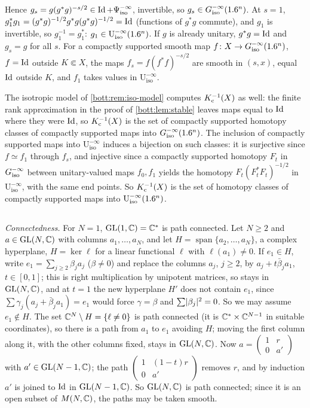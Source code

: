 Hence $g_s=g(g^*g)^{-s/2}\in\operatorname{Id}+\Psi^{-\infty}_{\mathrm{iso}}$, invertible, so $g_s\in G^{-\infty}_{\mathrm{iso}}(1.6^n)$. At $s=1$,
$g_1^*g_1=(g^*g)^{-1/2}g^*g(g^*g)^{-1/2}=\operatorname{Id}$ (functions of $g^*g$ commute), and $g_1$ is
invertible, so $g_1^{-1}=g_1^*$: $g_1\in\mathrm U^{-\infty}_{\mathrm{iso}}(1.6^n)$. If $g$ is
already unitary, $g^*g=\operatorname{Id}$ and $g_s=g$ for all $s$. For a compactly supported smooth map
$f\colon X\to G^{-\infty}_{\mathrm{iso}}(1.6^n)$, $f=\operatorname{Id}$ outside $K\Subset X$, the maps $f_s=f(f^*f)^{-s/2}$ are smooth
in $(s,x)$, equal $\operatorname{Id}$ outside $K$, and $f_1$ takes values in $\mathrm U^{-\infty}_{\mathrm{iso}}$.

The isotropic model of \cref{bott:rem:iso-model} computes $K_{\mathrm{c}}^{-1}(X)$ as well: the finite rank
approximation in the proof of \cref{bott:lem:stable} leaves maps equal to $\operatorname{Id}$ where they were
$\operatorname{Id}$, so $K_{\mathrm{c}}^{-1}(X)$ is the set of compactly supported homotopy classes of compactly supported
maps into $G^{-\infty}_{\mathrm{iso}}(1.6^n)$. The inclusion of compactly supported maps into
$\mathrm U^{-\infty}_{\mathrm{iso}}$ induces a bijection on such classes: it is surjective since
$f\simeq f_1$ through $f_s$, and injective since a compactly supported homotopy $F_t$ in $G^{-\infty}_{\mathrm{iso}}$
between unitary-valued maps $f_0,f_1$ yields the homotopy $F_t(F_t^*F_t)^{-1/2}$ in
$\mathrm U^{-\infty}_{\mathrm{iso}}$, with the same end points. So $K_{\mathrm{c}}^{-1}(X)$ is the set of
homotopy classes of compactly supported maps into $\mathrm U^{-\infty}_{\mathrm{iso}}(1.6^n)$.

\subsection*{}
\emph{Connectedness.} For $N=1$, $\operatorname{GL}(1,\mathbb{C})=\mathbb{C}^*$ is path connected. Let $N\ge2$ and
$a\in\operatorname{GL}(N,\mathbb{C})$ with columns $a_1,\dots,a_N$, and let $H=\operatorname{span}\{a_2,\dots,a_N\}$,
a complex hyperplane, $H=\ker\ell$ for a linear functional $\ell$ with $\ell(a_1)\ne0$. If
$e_1\in H$, write $e_1=\sum_{j\ge2}\beta_ja_j$ ($\beta\ne0$) and replace the columns $a_j$,
$j\ge2$, by $a_j+t\bar\beta_ja_1$, $t\in[0,1]$; this is right multiplication by unipotent
matrices, so stays in $\operatorname{GL}(N,\mathbb{C})$, and at $t=1$ the new hyperplane $H'$ does not contain $e_1$,
since $\sum\gamma_j(a_j+\bar\beta_ja_1)=e_1$ would force $\gamma=\beta$ and
$\sum\lvert \beta_j\rvert^2=0$. So we may assume $e_1\notin H$. The set $\mathbb{C}^N\setminus H=\{\ell\ne0\}$
is path connected (it is $\mathbb{C}^*\times\mathbb{C}^{N-1}$ in suitable coordinates), so there is a path from
$a_1$ to $e_1$ avoiding $H$; moving the first column along it, with the other columns fixed,
stays in $\operatorname{GL}(N,\mathbb{C})$. Now $a=\begin{pmatrix}1&r\\0&a'\end{pmatrix}$ with $a'\in\operatorname{GL}(N-1,\mathbb{C})$;
the path $\begin{pmatrix}1&(1-t)r\\0&a'\end{pmatrix}$ removes $r$, and by induction $a'$ is
joined to $\operatorname{Id}$ in $\operatorname{GL}(N-1,\mathbb{C})$. So $\operatorname{GL}(N,\mathbb{C})$ is path connected; since it is an open subset
of $M(N,\mathbb{C})$, the paths may be taken smooth.

